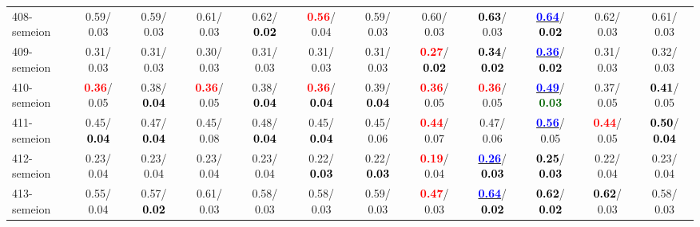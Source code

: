 \begin{table}[h]
\begin{center}
{\begin{tabular}{lc|c|c|c|c|c|c|c|c|c|c}
408-semeion &   0.59/  0.03 &   0.59/  0.03 &   0.61/  0.03 &   0.62/\textcolor{black}{\textbf{  0.02}} & \textcolor{red}{\textbf{  0.56}}/  0.04 &   0.59/  0.03 &   0.60/  0.03 & \textcolor{black}{\textbf{  0.63}}/  0.03 & \underline{\textcolor{blue}{\textbf{  0.64}}}/\textcolor{black}{\textbf{  0.02}} &   0.62/  0.03 &   0.61/  0.03 \\
409-semeion &   0.31/  0.03 &   0.31/  0.03 &   0.30/  0.03 &   0.31/  0.03 &   0.31/  0.03 &   0.31/  0.03 & \textcolor{red}{\textbf{  0.27}}/\textcolor{black}{\textbf{  0.02}} & \textcolor{black}{\textbf{  0.34}}/\textcolor{black}{\textbf{  0.02}} & \underline{\textcolor{blue}{\textbf{  0.36}}}/\textcolor{black}{\textbf{  0.02}} &   0.31/  0.03 &   0.32/  0.03 \\
410-semeion & \textcolor{red}{\textbf{  0.36}}/  0.05 &   0.38/\textcolor{black}{\textbf{  0.04}} & \textcolor{red}{\textbf{  0.36}}/  0.05 &   0.38/\textcolor{black}{\textbf{  0.04}} & \textcolor{red}{\textbf{  0.36}}/\textcolor{black}{\textbf{  0.04}} &   0.39/\textcolor{black}{\textbf{  0.04}} & \textcolor{red}{\textbf{  0.36}}/  0.05 & \textcolor{red}{\textbf{  0.36}}/  0.05 & \underline{\textcolor{blue}{\textbf{  0.49}}}/\textcolor{darkgreen}{\textbf{  0.03}} &   0.37/  0.05 & \textcolor{black}{\textbf{  0.41}}/  0.05 \\
411-semeion &   0.45/\textcolor{black}{\textbf{  0.04}} &   0.47/\textcolor{black}{\textbf{  0.04}} &   0.45/  0.08 &   0.48/\textcolor{black}{\textbf{  0.04}} &   0.45/\textcolor{black}{\textbf{  0.04}} &   0.45/  0.06 & \textcolor{red}{\textbf{  0.44}}/  0.07 &   0.47/  0.06 & \underline{\textcolor{blue}{\textbf{  0.56}}}/  0.05 & \textcolor{red}{\textbf{  0.44}}/  0.05 & \textcolor{black}{\textbf{  0.50}}/\textcolor{black}{\textbf{  0.04}} \\
412-semeion &   0.23/  0.04 &   0.23/  0.04 &   0.23/  0.04 &   0.23/  0.04 &   0.22/\textcolor{black}{\textbf{  0.03}} &   0.22/\textcolor{black}{\textbf{  0.03}} & \textcolor{red}{\textbf{  0.19}}/  0.04 & \underline{\textcolor{blue}{\textbf{  0.26}}}/\textcolor{black}{\textbf{  0.03}} & \textcolor{black}{\textbf{  0.25}}/\textcolor{black}{\textbf{  0.03}} &   0.22/  0.04 &   0.23/  0.04 \\ \hline
413-semeion &   0.55/  0.04 &   0.57/\textcolor{black}{\textbf{  0.02}} &   0.61/  0.03 &   0.58/  0.03 &   0.58/  0.03 &   0.59/  0.03 & \textcolor{red}{\textbf{  0.47}}/  0.03 & \underline{\textcolor{blue}{\textbf{  0.64}}}/\textcolor{black}{\textbf{  0.02}} & \textcolor{black}{\textbf{  0.62}}/\textcolor{black}{\textbf{  0.02}} & \textcolor{black}{\textbf{  0.62}}/  0.03 &   0.58/  0.03 \\

\end{tabular}}
\end{center}
\end{table}
